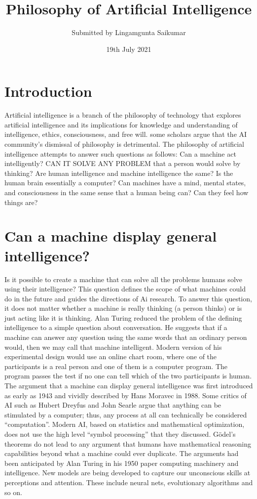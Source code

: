 \documentclass{article}
\title{Philosophy of Artificial Intelligence}
\author{Submitted by Lingamgunta Saikumar}
\date{19th July 2021}
\begin{document}
\maketitle

\section{Introduction}
Artificial intelligence is a branch of the philosophy of technology that explores artificial intelligence and its implications for knowledge and understanding of intelligence, ethics, consciousness, and free will. some scholars argue that the AI community’s dismissal of philosophy is detrimental. The philosophy of artificial intelligence attempts to answer such questions as follows: Can a machine act intelligently? CAN IT SOLVE ANY PROBLEM that a person would solve by thinking? Are human intelligence and machine intelligence the same?
Is the human brain essentially a computer? Can machines have a mind, mental states, and consciousness in the same sense that a human being can? Can they feel how things are?
\section{Can a machine display general intelligence? }
Is it possible to create a machine that can solve all the problems humans solve using their intelligence? This question defines the scope of what machines could do in the future and guides the directions of Ai research. To answer this question, it does not matter whether a machine is really thinking (a person thinks) or is just acting like it is thinking.
Alan Turing reduced the problem of the defining intelligence to a simple question about conversation. He suggests that if a machine can answer any question using the same words that an ordinary person would, then we may call that machine intelligent. Modern version of his experimental design would use an online chart room, where one of the participants is a real person and one of them is a computer program. The program passes the test if no one can tell which of the two participants is human.
The argument that a machine can display general intelligence was first introduced as early as 1943 and vividly described by Hans Moravec in 1988. Some critics of AI such as Hubert Dreyfus and John Searle argue that anything can be stimulated by a computer; thus, any process at all can technically be considered “computation”.
Modern AI, based on statistics and mathematical optimization, does not use the high level “symbol processing” that they discussed. Gödel’s theorems do not lead to any argument that humans have mathematical reasoning capabilities beyond what a machine could ever duplicate. The arguments had been anticipated by Alan Turing in his 1950 paper computing machinery and intelligence. New models are being developed to capture our unconscious skills at perceptions and attention. These include neural nets, evolutionary algorithms and so on.
\end{document}

